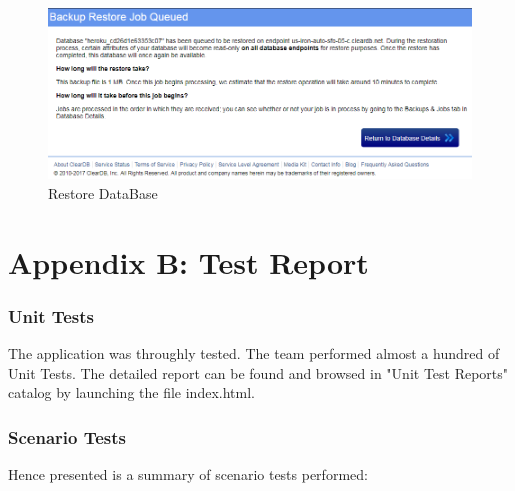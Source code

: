 \documentclass[a4paper,11pt,twoside]{report}
\theoremstyle{definition}
\begin{document}
\begin{figure}[h!]
\begin{center}
\includegraphics[width=\textwidth]{DB/11}
\end{center}
\caption{Restore DataBase}
\end{figure}
\thispagestyle{empty}














\chapter{Appendix B: Test Report}

\subsection{Unit Tests} The application was throughly tested. The team performed almost a hundred of Unit Tests. The detailed report can be found and browsed in "Unit Test Reports" catalog by launching the file index.html.
\subsection{Scenario Tests} Hence presented is a summary of scenario tests performed:
\end{document}
